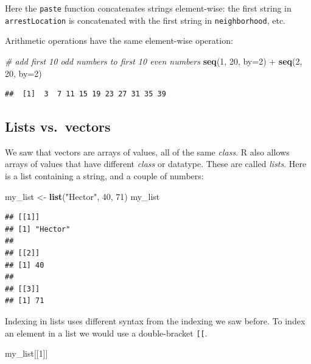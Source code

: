 \documentclass[]{article}
\newenvironment{Shaded}{\begin{snugshade}}{\end{snugshade}}
\newcommand{\KeywordTok}[1]{\textcolor[rgb]{0.13,0.29,0.53}{\textbf{{#1}}}}
\newcommand{\DataTypeTok}[1]{\textcolor[rgb]{0.13,0.29,0.53}{{#1}}}
\newcommand{\DecValTok}[1]{\textcolor[rgb]{0.00,0.00,0.81}{{#1}}}
\newcommand{\StringTok}[1]{\textcolor[rgb]{0.31,0.60,0.02}{{#1}}}
\newcommand{\CommentTok}[1]{\textcolor[rgb]{0.56,0.35,0.01}{\textit{{#1}}}}
\newcommand{\NormalTok}[1]{{#1}}
\theoremstyle{definition}
\theoremstyle{definition}
\theoremstyle{remark}
\begin{document}
Here the \texttt{paste} function concatenates strings element-wise: the
first string in \texttt{arrestLocation} is concatenated with the first
string in \texttt{neighborhood}, etc.

Arithmetic operations have the same element-wise operation:

\begin{Shaded}
\begin{Highlighting}[]
\CommentTok{# add first 10 odd numbers to first 10 even numbers}
\KeywordTok{seq}\NormalTok{(}\DecValTok{1}\NormalTok{, }\DecValTok{20}\NormalTok{, }\DataTypeTok{by=}\DecValTok{2}\NormalTok{) +}\StringTok{ }\KeywordTok{seq}\NormalTok{(}\DecValTok{2}\NormalTok{, }\DecValTok{20}\NormalTok{, }\DataTypeTok{by=}\DecValTok{2}\NormalTok{)}
\end{Highlighting}
\end{Shaded}

\begin{verbatim}
##  [1]  3  7 11 15 19 23 27 31 35 39
\end{verbatim}

\subsection{Lists vs.~vectors}\label{lists-vs.vectors}

We saw that vectors are arrays of values, all of the same \emph{class}.
R also allows arrays of values that have different \emph{class} or
datatype. These are called \emph{lists}. Here is a list containing a
string, and a couple of numbers:

\begin{Shaded}
\begin{Highlighting}[]
\NormalTok{my_list <-}\StringTok{ }\KeywordTok{list}\NormalTok{(}\StringTok{"Hector"}\NormalTok{, }\DecValTok{40}\NormalTok{, }\DecValTok{71}\NormalTok{)}
\NormalTok{my_list}
\end{Highlighting}
\end{Shaded}

\begin{verbatim}
## [[1]]
## [1] "Hector"
## 
## [[2]]
## [1] 40
## 
## [[3]]
## [1] 71
\end{verbatim}

Indexing in lists uses different syntax from the indexing we saw before.
To index an element in a list we would use a double-bracket
\texttt{{[}{[}}.

\begin{Shaded}
\begin{Highlighting}[]
\NormalTok{my_list[[}\DecValTok{1}\NormalTok{]]}
\end{Highlighting}
\end{Shaded}
\end{document}
